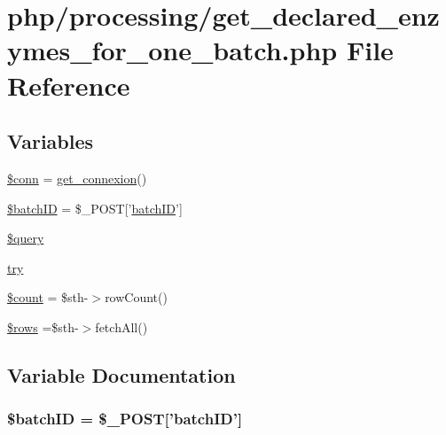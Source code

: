 \hypertarget{get__declared__enzymes__for__one__batch_8php}{\section{php/processing/get\-\_\-declared\-\_\-enzymes\-\_\-for\-\_\-one\-\_\-batch.php File Reference}
\label{get__declared__enzymes__for__one__batch_8php}
}
\subsection*{Variables}
\begin{DoxyCompactItemize}
\item 
\hyperlink{get__declared__enzymes__for__one__batch_8php_aa8a5a87b9c1a6a0819b88447cbe41877}{\$conn} = \hyperlink{php__functions_8php_ace18bc10f3fd08f92688ac743e0d8c2e}{get\-\_\-connexion}()
\item 
\hyperlink{get__declared__enzymes__for__one__batch_8php_aaa6d122ea9cb55b210aadd86e5654a74}{\$batch\-I\-D} = \$\-\_\-\-P\-O\-S\-T\mbox{[}'\hyperlink{obsolete_2processing__bak_8php_a88c5bc4262b7c34f236357f5c53fc99b}{batch\-I\-D}'\mbox{]}
\item 
\hyperlink{get__declared__enzymes__for__one__batch_8php_af59a5f7cd609e592c41dc3643efd3c98}{\$query}
\item 
\hyperlink{get__declared__enzymes__for__one__batch_8php_abe4cc9788f52e49485473dc699537388}{try}
\item 
\hyperlink{get__declared__enzymes__for__one__batch_8php_af789423037bbc89dc7c850e761177570}{\$count} = \$sth-\/$>$row\-Count()
\item 
\hyperlink{get__declared__enzymes__for__one__batch_8php_ace2ec39e7df3899fa8df9640ec274b03}{\$rows} =\$sth-\/$>$fetch\-All()
\end{DoxyCompactItemize}


\subsection{Variable Documentation}
\hypertarget{get__declared__enzymes__for__one__batch_8php_aaa6d122ea9cb55b210aadd86e5654a74}{
\subsubsection[{\$batch\-I\-D}]{\setlength{\rightskip}{0pt plus 5cm}\${\bf batch\-I\-D} = \$\-\_\-\-P\-O\-S\-T\mbox{[}'{\bf batch\-I\-D}'\mbox{]}}}\label{get__declared__enzymes__for__one__batch_8php_aaa6d122ea9cb55b210aadd86e5654a74}


